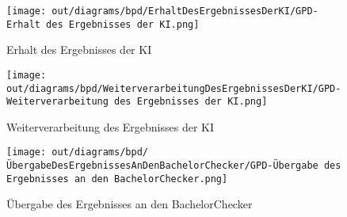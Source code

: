 \begin{figure}[H]
    \centering
    \texttt{[image: out/diagrams/bpd/ErhaltDesErgebnissesDerKI/GPD-Erhalt des Ergebnisses der KI.png]}
    \caption{Erhalt des Ergebnisses der KI}
    \label{fig:erhaltDesErgebnissesDerKI}
\end{figure}

\begin{figure}[H]
    \centering
    \texttt{[image: out/diagrams/bpd/WeiterverarbeitungDesErgebnissesDerKI/GPD-Weiterverarbeitung des Ergebnisses der KI.png]}
    \caption{Weiterverarbeitung des Ergebnisses der KI}
    \label{fig:weiterverarbeitungDesErgebnissesDerKI}
\end{figure}

\begin{figure}[H]
    \centering
    \texttt{[image: out/diagrams/bpd/ÜbergabeDesErgebnissesAnDenBachelorChecker/GPD-Übergabe des Ergebnisses an den BachelorChecker.png]}
    \caption{Übergabe des Ergebnisses an den BachelorChecker}
    \label{fig:uebergabeDesErgebnissesAnDenBachelorChecker}
\end{figure}

